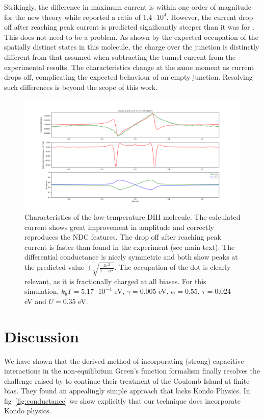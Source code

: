 \documentclass{article}
\begin{document}
\begin{multicols}{2}
        Strikingly, the difference in maximum current is within one order of magnitude for the new theory while \citet{perrinnano} reported a ratio of $1.4\cdot10^{4}$. However, the current drop off after reaching peak current is predicted significantly steeper than it was for \citet{perrinnano}. This does not need to be a problem. As shown by the expected occupation of the spatially distinct states in this molecule, the charge over the junction is distinctly different from that assumed when subtracting the tunnel current from the experimental results. The characteristics change at the same moment as current drops off, complicating the expected behaviour of an empty junction. Resolving such differences is beyond the scope of this work.
        
    \begin{figure}[b]
        \centering
        \includegraphics[width=\textwidth]{figure_gam0050alpha55tau024capacitive35points200.png}
        \caption{\label{fig:perrinmolecule} Characteristics of the low-temperature DIH molecule. The calculated current shows great improvement in amplitude and correctly reproduces the NDC features. The drop off after reaching peak current  is faster than found in the experiment (see main text). The differential conductance is nicely symmetric and both show peaks at the predicted value $\pm\sqrt{\frac{4\tau^2}{1-\alpha^2}}$. The occupation of the dot is clearly relevant, as it is fractionally charged at all biases. For this simulation, $k_b T=5.17\cdot 10^{-4}$ eV, $\gamma=0.005$ eV, $\alpha=0.55$, $\tau=0.024$ eV and $U=0.35$ eV.}
    \end{figure}
    
    \section{Discussion}\label{sec:discussion}
    We have shown that the derived method of incorporating (strong) capacitive interactions in the non-equilibrium Green's function formalism finally resolves the challenge raised by \citet{haugjauho} to continue their treatment of the Coulomb Island at finite bias. They found an appealingly simple approach that lacks Kondo Physics. In fig~\ref{fig:conductance} we show explicitly that our technique does incorporate Kondo physics.
    

\end{multicols}
\end{document}
